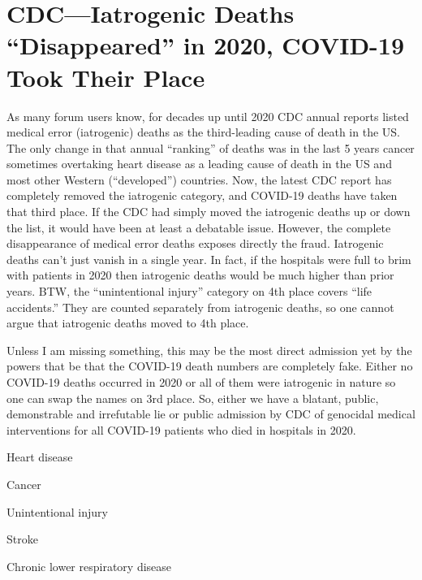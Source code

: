 \chapter{CDC---Iatrogenic Deaths \enquote{Disappeared} in 2020, COVID-19 Took Their Place}

\begin{refsection}

As many forum users know, for decades up until 2020 CDC annual reports listed medical error (iatrogenic) deaths as the third-leading cause of death in the US. The only change in that annual \enquote{ranking} of deaths was in the last 5 years cancer sometimes overtaking heart disease as a leading cause of death in the US and most other Western (\enquote{developed}) countries. Now, the latest CDC report has completely removed the iatrogenic category, and COVID-19 deaths have taken that third place. If the CDC had simply moved the iatrogenic deaths up or down the list, it would have been at least a debatable issue. However, the complete disappearance of medical error deaths exposes directly the fraud. Iatrogenic deaths can't just vanish in a single year. In fact, if the hospitals were full to brim with patients in 2020 then iatrogenic deaths would be much higher than prior years. BTW, the \enquote{unintentional injury} category on 4th place covers \enquote{life accidents.} They are counted separately from iatrogenic deaths, so one cannot argue that iatrogenic deaths moved to 4th place.

Unless I am missing something, this may be the most direct admission yet by the powers that be that the COVID-19 death numbers are completely fake. Either no COVID-19 deaths occurred in 2020 or all of them were iatrogenic in nature so one can swap the names on 3rd place. So, either we have a blatant, public, demonstrable and irrefutable lie or public admission by CDC of genocidal medical interventions for all COVID-19 patients who died in hospitals in 2020.\textsuperscript{\cite{urlfe446e23}}

\begin{tcolorbox}[quote]

Heart disease

Cancer


Unintentional injury

Stroke

Chronic lower respiratory disease


\end{tcolorbox}
\end{refsection}
